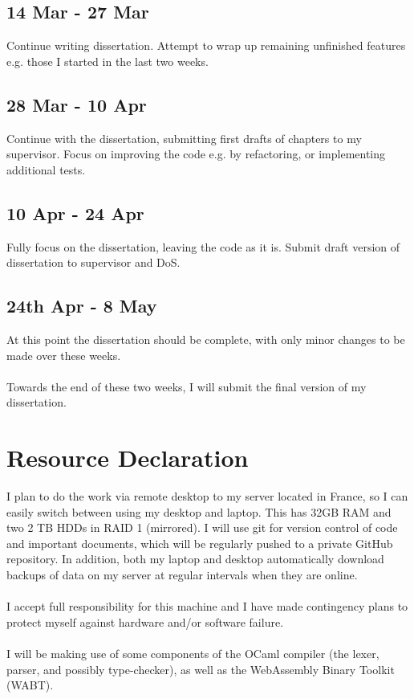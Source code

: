 \documentclass[12pt]{article}
\begin{document}
	\subsection*{14 Mar - 27 Mar}
	Continue writing dissertation. Attempt to wrap up remaining unfinished features e.g. those I started in the last two weeks.
	
	\subsection*{28 Mar - 10 Apr}
	Continue with the dissertation, submitting first drafts of chapters to my supervisor. Focus on improving the code e.g. by refactoring, or implementing additional tests.
	
	\subsection*{10 Apr - 24 Apr}
	Fully focus on the dissertation, leaving the code as it is. Submit draft version of dissertation to supervisor and DoS.
	
	\subsection*{24th Apr - 8 May}
	At this point the dissertation should be complete, with only minor changes to be made over these weeks.
	\\\\
	Towards the end of these two weeks, I will submit the final version of my dissertation.
	
	
	\section*{Resource Declaration}
	I plan to do the work via remote desktop to my server located in France, so I can easily switch between using my desktop and laptop. This has 32GB RAM and two 2 TB HDDs in RAID 1 (mirrored). I will use git for version control of code and important documents, which will be regularly pushed to a private GitHub repository. In addition, both my laptop and desktop automatically download backups of data on my server at regular intervals when they are online.
	\\\\
	I accept full responsibility for this machine and I have made contingency plans to protect myself against hardware and/or software failure.
	\\\\
	I will be making use of some components of the OCaml compiler (the lexer, parser, and possibly type-checker), as well as the WebAssembly Binary Toolkit (WABT).
	
\end{document}
